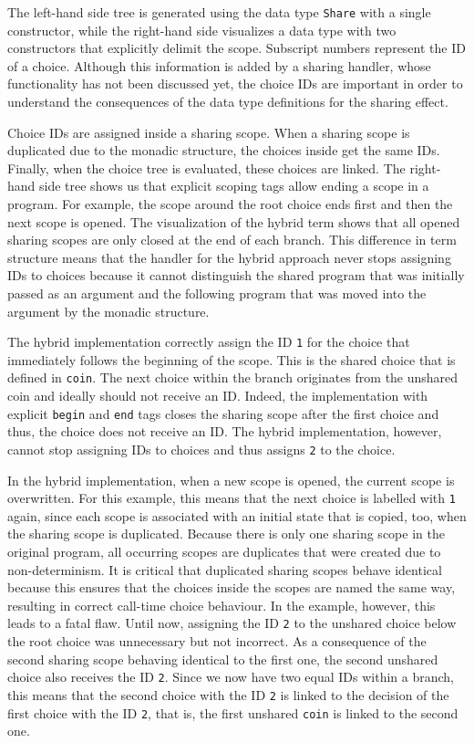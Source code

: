 \documentclass[a4paper, 11pt, fleqn, twoside]{scrreprt}
\newcommand{\hinl}[1]{\texttt{#1}}
\begin{document}
\vspace{0.32cm}

The left-hand side tree is generated using the data type \hinl{Share} with a single constructor, while the right-hand side visualizes a data type with two constructors that explicitly delimit the scope.
Subscript numbers represent the ID of a choice.
Although this information is added by a sharing handler, whose functionality has not been discussed yet, the choice IDs are important in order to understand the consequences of the data type definitions for the sharing effect.

Choice IDs are assigned inside a sharing scope.
When a sharing scope is duplicated due to the monadic structure, the choices inside get the same IDs.
Finally, when the choice tree is evaluated, these choices are linked.
The right-hand side tree shows us that explicit scoping tags allow ending a scope in a program.
For example, the scope around the root choice ends first and then the next scope is opened.
The visualization of the hybrid term shows that all opened sharing scopes are only closed at the end of each branch.
This difference in term structure means that the handler for the hybrid approach never stops assigning IDs to choices because it cannot distinguish the shared program that was initially passed as an argument and the following program that was moved into the argument by the monadic structure.

The hybrid implementation correctly assign the ID \hinl{1} for the choice that immediately follows the beginning of the scope.
This is the shared choice that is defined in \hinl{coin}.
The next choice within the branch originates from the unshared coin and ideally should not receive an ID.
Indeed, the implementation with explicit \hinl{begin} and \hinl{end} tags closes the sharing scope after the first choice and thus, the choice does not receive an ID.
The hybrid implementation, however, cannot stop assigning IDs to choices and thus assigns \hinl{2} to the choice.

In the hybrid implementation, when a new scope is opened, the current scope is overwritten.
For this example, this means that the next choice is labelled with \hinl{1} again, since each scope is associated with an initial state that is copied, too, when the sharing scope is duplicated.
Because there is only one sharing scope in the original program, all occurring scopes are duplicates that were created due to non-determinism.
It is critical that duplicated sharing scopes behave identical because this ensures that the choices inside the scopes are named the same way, resulting in correct call-time choice behaviour.
In the example, however, this leads to a fatal flaw.
Until now, assigning the ID \hinl{2} to the unshared choice below the root choice was unnecessary but not incorrect.
As a consequence of the second sharing scope behaving identical to the first one, the second unshared choice also receives the ID \hinl{2}.
Since we now have two equal IDs within a branch, this means that the second choice with the ID \hinl{2} is linked to the decision of the first choice with the ID \hinl{2}, that is, the first unshared \hinl{coin} is linked to the second one.
\end{document}
